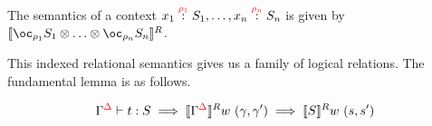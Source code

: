 The semantics of a context $\ctxvar{x_1}{S_1}{\rho_1}, \ldots, \ctxvar{x_n}{S_n}{\rho_n}$ is given by $\tensor{\llbracket \excl{\rho_1}{S_1}}{\tensor{\ldots}{\excl{\rho_n}{S_n}}} \rrbracket^R$.

This indexed relational semantics gives us a family of logical relations.
The fundamental lemma is as follows.

\begin{theorem}
  \begin{displaymath}
    \ctx{\Gamma}{\Delta} \vdash t : S \implies \llbracket \ctx{\Gamma}{\Delta} \rrbracket^R w~(\gamma, \gamma') \implies \llbracket S \rrbracket^R w~(s, s')
  \end{displaymath}
\end{theorem}


